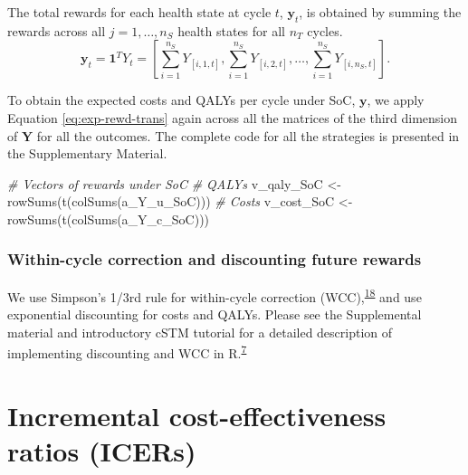 \documentclass[
]{article}
\newenvironment{Shaded}{\begin{snugshade}}{\end{snugshade}}
\newcommand{\CommentTok}[1]{\textcolor[rgb]{0.56,0.35,0.01}{\textit{#1}}}
\newcommand{\FunctionTok}[1]{\textcolor[rgb]{0.00,0.00,0.00}{#1}}
\newcommand{\NormalTok}[1]{#1}
\newcommand{\OtherTok}[1]{\textcolor[rgb]{0.56,0.35,0.01}{#1}}
\begin{document}
The total rewards for each health state at cycle \(t\), \(\mathbf{y}_t\), is obtained by summing the rewards across all \(j = 1,\ldots, n_S\) health states for all \(n_T\) cycles.
\begin{equation}
  \mathbf{y}_t = \mathbf{1}^T Y_t = \left[\sum_{i=1}^{n_S}{Y_{[i,1,t]}}, \sum_{i=1}^{n_S}{Y_{[i,2,t]}}, \dots , \sum_{i=1}^{n_S}{Y_{[i,n_S,t]}}\right].
  \label{eq:exp-rewd-trans}
\end{equation}

To obtain the expected costs and QALYs per cycle under SoC, \(\mathbf{y}\), we apply Equation \eqref{eq:exp-rewd-trans} again across all the matrices of the third dimension of \(\mathbf{Y}\) for all the outcomes. The complete code for all the strategies is presented in the Supplementary Material.

\begin{Shaded}
\begin{Highlighting}[]
\CommentTok{\# Vectors of rewards under SoC}
\CommentTok{\# QALYs}
\NormalTok{v\_qaly\_SoC }\OtherTok{\textless{}{-}} \FunctionTok{rowSums}\NormalTok{(}\FunctionTok{t}\NormalTok{(}\FunctionTok{colSums}\NormalTok{(a\_Y\_u\_SoC)))}
\CommentTok{\# Costs}
\NormalTok{v\_cost\_SoC }\OtherTok{\textless{}{-}} \FunctionTok{rowSums}\NormalTok{(}\FunctionTok{t}\NormalTok{(}\FunctionTok{colSums}\NormalTok{(a\_Y\_c\_SoC)))}
\end{Highlighting}
\end{Shaded}

\hypertarget{within-cycle-correction-and-discounting-future-rewards}{%
\subsubsection{Within-cycle correction and discounting future rewards}\label{within-cycle-correction-and-discounting-future-rewards}}

We use Simpson's 1/3rd rule for within-cycle correction (WCC),\textsuperscript{\protect\hyperlink{ref-Elbasha2016a}{18}} and use exponential discounting for costs and QALYs. Please see the Supplemental material and introductory cSTM tutorial for a detailed description of implementing discounting and WCC in R.\textsuperscript{\protect\hyperlink{ref-Alarid-Escudero2022b}{7}}

\hypertarget{incremental-cost-effectiveness-ratios-icers}{%
\section{Incremental cost-effectiveness ratios (ICERs)}\label{incremental-cost-effectiveness-ratios-icers}}
\end{document}
